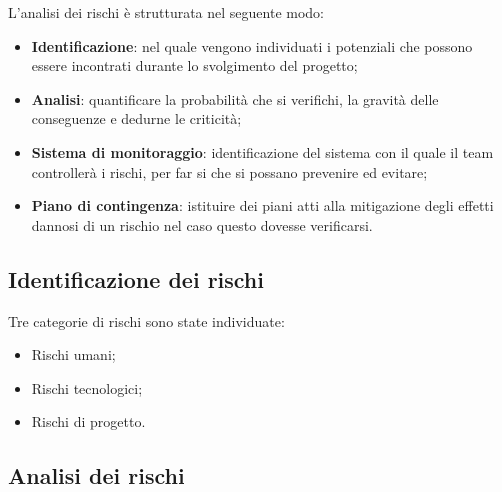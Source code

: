 L'analisi dei rischi è strutturata nel seguente modo:
\begin{itemize}
	\item \textbf{Identificazione}: nel quale vengono individuati i potenziali  che possono essere incontrati durante lo svolgimento del progetto;
	\item \textbf{Analisi}: quantificare la probabilità che si verifichi,
	la gravità delle conseguenze e dedurne le criticità;
	\item \textbf{Sistema di monitoraggio}: identificazione del sistema con il quale il team controllerà i rischi, per far si che si possano prevenire ed evitare;
	\item \textbf{Piano di contingenza}: istituire dei piani atti alla mitigazione degli effetti dannosi di un rischio nel caso questo dovesse verificarsi.
\end{itemize} 
\subsection{Identificazione dei rischi}
	Tre categorie di rischi sono state individuate:
	\begin{itemize}
		\item Rischi umani;
		\item Rischi tecnologici;
		\item Rischi di progetto.
	\end{itemize}
\subsection{Analisi dei rischi}
